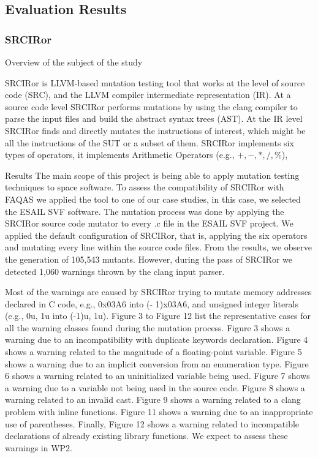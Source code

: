 \subsection{Evaluation Results}

\subsubsection{SRCIRor}

Overview of the subject of the study

SRCIRor is LLVM-based mutation testing tool that works at the level of source code (SRC), and the LLVM compiler intermediate representation (IR). 
At a source code level SRCIRor performs mutations by using the clang compiler to parse the input files and build the abstract syntax trees (AST). 
At the IR level SRCIRor finds and directly mutates the instructions of interest, which might be all the instructions of the SUT or a subset of them. 
SRCIRor implements six types of operators, it implements Arithmetic Operators (e.g., $+, -, *, /, \%$),


Results
The main scope of this project is being able to apply mutation testing techniques to space software. To assess the compatibility of SRCIRor with FAQAS we applied the tool to one of our case studies, in this case, we selected the ESAIL SVF software.
The mutation process was done by applying the SRCIRor source code mutator to every .c file in the ESAIL SVF project. We applied the default configuration of SRCIRor, that is, applying the six operators and mutating every line within the source code files.
From the results, we observe the generation of 105,543 mutants. However, during the pass of SRCIRor we detected 1,060 warnings thrown by the clang input parser.

Most of the warnings are caused by SRCIRor trying to mutate memory addresses declared in C code, e.g., 0x03A6 into (- 1)x03A6, and unsigned integer literals (e.g., 0u, 1u into (-1)u, 1u).
Figure 3 to Figure 12 list the representative cases for all the warning classes found during the mutation process. Figure 3 shows a warning due to an incompatibility with duplicate keywords declaration. Figure 4 shows a warning related to the magnitude of a floating-point variable. Figure 5 shows a warning due to an implicit conversion from an enumeration type. Figure 6 shows a warning related to an uninitialized variable being used. Figure 7 shows a warning due to a variable not being used in the source code. Figure 8 shows a warning related to an invalid cast. Figure 9 shows a warning related to a clang problem with inline functions. Figure 11 shows a warning due to an inappropriate use of parentheses. Finally, Figure 12 shows a warning related to incompatible declarations of already existing library functions. We expect to assess these warnings in WP2.

